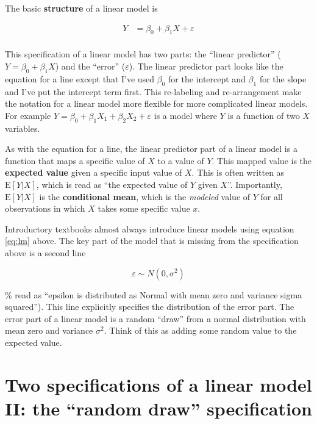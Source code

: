 \documentclass[]{book}
\begin{document}
The basic \textbf{structure} of a linear model is

\begin{align}
Y &= \beta_0 + \beta_1 X + \varepsilon\\
\label{eq:lm}
\end{align}

This specification of a linear model has two parts: the ``linear
predictor'' (\(Y = \beta_0 + \beta_1 X\)) and the ``error''
(\(\varepsilon\)). The linear predictor part looks like the equation for
a line except that I've used \(\beta_0\) for the intercept and
\(\beta_1\) for the slope and I've put the intercept term first. This
re-labeling and re-arrangement make the notation for a linear model more
flexible for more complicated linear models. For example
\(Y = \beta_0 + \beta_1 X_1 + \beta_2 X_2 + \varepsilon\) is a model
where \(Y\) is a function of two \(X\) variables.

As with the equation for a line, the linear predictor part of a linear
model is a function that maps a specific value of \(X\) to a value of
\(Y\). This mapped value is the \textbf{expected value} given a specific
input value of \(X\). This is often written as \(\mathrm{E}[Y|X]\),
which is read as ``the expected value of \(Y\) given \(X\)''.
Importantly, \(\mathrm{E}[Y|X]\) is the \textbf{conditional mean}, which
is the \emph{modeled} value of \(Y\) for all observations in which \(X\)
takes some specific value \(x\).

Introductory textbooks almost always introduce linear models using
equation \eqref{eq:lm} above. The key part of the model that is missing
from the specification above is a second line

\begin{equation}
\varepsilon \sim N(0, \sigma^2)
\end{equation}

\% read as ``epsilon is distributed as Normal with mean zero and
variance sigma squared''). This line explicitly specifies the
distribution of the error part. The error part of a linear model is a
random ``draw'' from a normal distribution with mean zero and variance
\(\sigma^2\). Think of this as adding some random value to the expected
value.

\section{\texorpdfstring{Two specifications of a linear model II: the
``random draw''
specification}{Two specifications of a linear model II: the random draw specification}}\label{two-specifications-of-a-linear-model-ii-the-random-draw-specification}
\end{document}

